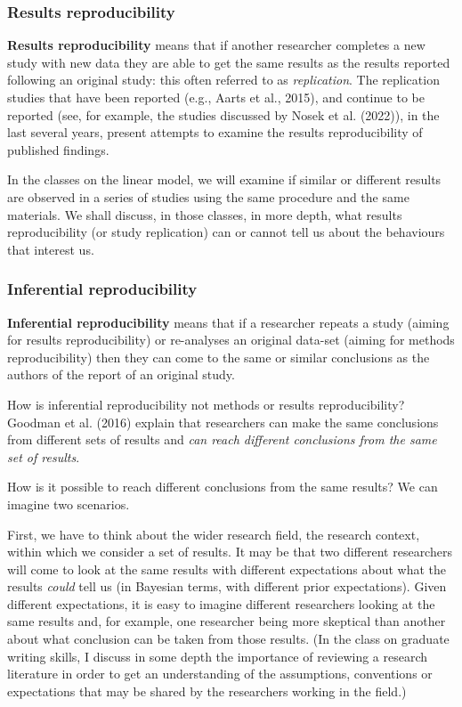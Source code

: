\documentclass[
  letterpaper,
  DIV=11,
  numbers=noendperiod]{scrreprt}
\begin{document}
\hypertarget{sec-resultsrepro}{%
\subsubsection{Results reproducibility}\label{sec-resultsrepro}}

\textbf{Results reproducibility} means that if another researcher
completes a new study with new data they are able to get the same
results as the results reported following an original study: this often
referred to as \emph{replication}. The replication studies that have
been reported (e.g., Aarts et al., 2015), and continue to be reported
(see, for example, the studies discussed by Nosek et al. (2022)), in the
last several years, present attempts to examine the results
reproducibility of published findings.

In the classes on the linear model, we will examine if similar or
different results are observed in a series of studies using the same
procedure and the same materials. We shall discuss, in those classes, in
more depth, what results reproducibility (or study replication) can or
cannot tell us about the behaviours that interest us.

\hypertarget{sec-inferencerepro}{%
\subsubsection{Inferential reproducibility}\label{sec-inferencerepro}}

\textbf{Inferential reproducibility} means that if a researcher repeats
a study (aiming for results reproducibility) or re-analyses an original
data-set (aiming for methods reproducibility) then they can come to the
same or similar conclusions as the authors of the report of an original
study.

How is inferential reproducibility not methods or results
reproducibility? Goodman et al. (2016) explain that researchers can make
the same conclusions from different sets of results and \emph{can reach
different conclusions from the same set of results}.

How is it possible to reach different conclusions from the same results?
We can imagine two scenarios.

First, we have to think about the wider research field, the research
context, within which we consider a set of results. It may be that two
different researchers will come to look at the same results with
different expectations about what the results \emph{could} tell us (in
Bayesian terms, with different prior expectations). Given different
expectations, it is easy to imagine different researchers looking at the
same results and, for example, one researcher being more skeptical than
another about what conclusion can be taken from those results. (In the
class on graduate writing skills, I discuss in some depth the importance
of reviewing a research literature in order to get an understanding of
the assumptions, conventions or expectations that may be shared by the
researchers working in the field.)
\end{document}
